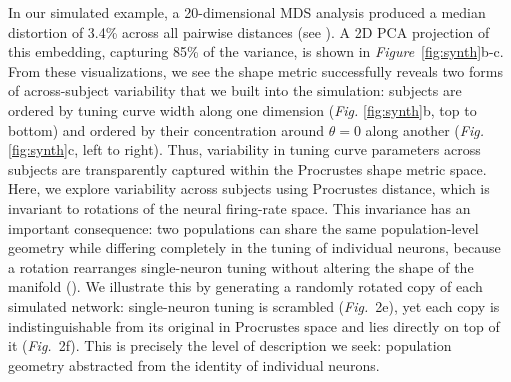 In our simulated example, a 20-dimensional MDS analysis produced a median distortion of \textapprox{}3.4\% across all pairwise distances (see \textit{}).
A 2D PCA projection of this embedding, capturing \textapprox{}85\% of the variance, is shown in \textit{Figure}~\ref{fig:synth}b-c.
From these visualizations, we see the shape metric successfully reveals two forms of across-subject variability that we built into the simulation: subjects are ordered by tuning curve width along one dimension (\textit{Fig.} \ref{fig:synth}b, top to bottom) and ordered by their concentration around $\theta=0$ along another (\textit{Fig.} \ref{fig:synth}c, left to right).
Thus, variability in tuning curve parameters across subjects are transparently captured within the Procrustes shape metric space. Here, we explore variability across subjects using Procrustes distance, which is invariant to rotations of the neural firing-rate space. This invariance has an important consequence: two populations can share the same population-level geometry while differing completely in the tuning of individual neurons, because a rotation rearranges single-neuron tuning without altering the shape of the manifold (\cite{Kriegeskorte2021}). We illustrate this by generating a randomly rotated copy of each simulated network: single-neuron tuning is scrambled (\textit{Fig.}~2e), yet each copy is indistinguishable from its original in Procrustes space and lies directly on top of it (\textit{Fig.}~2f). This is precisely the level of description we seek: population geometry abstracted from the identity of individual neurons.



